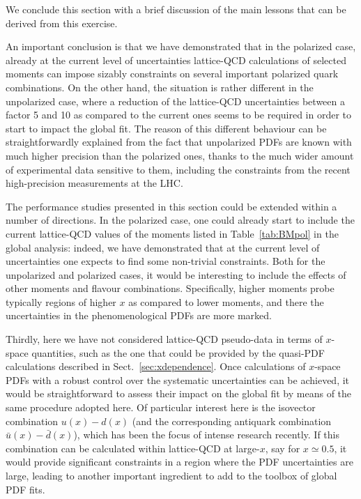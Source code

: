 We conclude this section with a brief discussion of the main lessons that
can be derived from this exercise.

An important conclusion is that we have demonstrated that in the polarized case,
already at the current level of uncertainties lattice-QCD calculations of
selected moments can impose sizably constraints on several
important polarized quark combinations.
%
On the other hand, the situation is rather different in the unpolarized case,
where a reduction of the lattice-QCD uncertainties between a factor 5 and 10 as compared
to the current ones seems to be required in order to start to impact the global
fit.
%
The reason of this different behaviour can be straightforwardly explained from
the fact that unpolarized PDFs are known with much higher precision than the polarized
ones, thanks to the much wider amount of experimental data sensitive to them,
including the constraints from the recent high-precision measurements at the
LHC.

The performance studies presented in this section could be extended within
a number of directions.
%
In the polarized case, one could already start to include the current lattice-QCD
values of the moments listed in Table~\ref{tab:BMpol} in the global analysis: indeed,
we have demonstrated that at the current level of uncertainties one expects
to find some non-trivial constraints.
%
Both for the unpolarized and polarized cases, it would be interesting to include the effects
of other moments and flavour combinations.
%
Specifically, higher moments probe typically regions of higher $x$ as compared
to lower moments, and there the uncertainties in the phenomenological PDFs are
more marked.


Thirdly, here we have not considered lattice-QCD pseudo-data in terms of $x$-space
quantities, such as the one that could be provided by the quasi-PDF calculations
described in Sect.~\ref{sec:xdependence}.
%
Once calculations of $x$-space PDFs with a robust control over the systematic
uncertainties can be achieved, it would be straightforward to assess their
impact on the global fit by means of the same procedure adopted here.
%
Of particular interest here is the isovector combination $u(x)-d(x)$
(and the corresponding antiquark combination $\bar{u}(x)-\bar{d}(x)$), which
has been the focus of intense research recently.
%
If this combination can be calculated within lattice-QCD at large-$x$,
say for $x\simeq 0.5$, it would
provide significant constraints in a region where the PDF uncertainties are large,
leading to another important ingredient to add to the toolbox
of global PDF fits.

